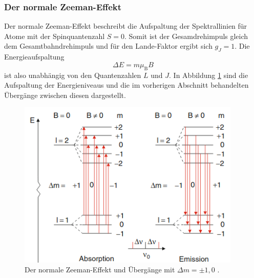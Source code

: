 \subsubsection*{Der normale Zeeman-Effekt}
Der normale Zeeman-Effekt beschreibt die Aufspaltung der Spektrallinien für Atome mit der Spinquantenzahl $S=0$. Somit ist der Gesamdrehimpuls gleich dem Gesamtbahndrehimpuls und für den Lande-Faktor ergibt sich $g_J=1$. Die Energieaufspaltung
\begin{equation}
    \label{eq:energie}
\Delta E = m \mu_\text{B}B
\end{equation}
ist also unabhängig von den Quantenzahlen $L$ und $J$. In Abbildung \ref{fig:tfig3} sind die Aufspaltung der Energieniveaus und die im vorherigen Abschnitt behandelten Übergänge zwischen diesen dargestellt.
\begin{figure}
\centering
\includegraphics[height=8.0cm]{normalzeeman.png}
\caption{Der normale Zeeman-Effekt und Übergänge mit $\Delta m = \pm 1, 0$ \cite{quelle01}.}
\label{fig:tfig3}
\end{figure}

